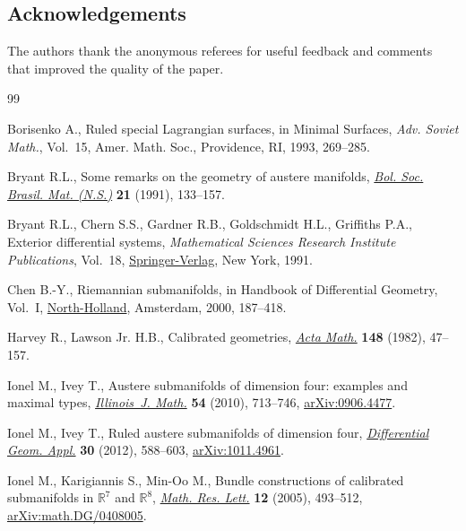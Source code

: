 \documentclass[10pt,a4paper]{amsart}
\numberwithin{equation}{section}
\begin{document}
\subsection*{Acknowledgements}
The authors thank the anonymous referees for useful feedback and comments that improved the quality of the paper.


\begin{thebibliography}{99}
\footnotesize\itemsep=0pt

Borisenko A., Ruled special {L}agrangian surfaces, in Minimal Surfaces,
 \textit{Adv. Soviet Math.}, Vol.~15, Amer. Math. Soc., Providence, RI, 1993,
 269--285.

Bryant R.L., Some remarks on the geometry of austere manifolds, \href{https://doi.org/10.1007/BF01237361}{\textit{Bol.
 Soc. Brasil. Mat. (N.S.)}} \textbf{21} (1991), 133--157.

Bryant R.L., Chern S.S., Gardner R.B., Goldschmidt H.L., Griffiths P.A.,
 Exterior differential systems, \textit{Mathematical Sciences Research
 Institute Publications}, Vol.~18, \href{https://doi.org/10.1007/978-1-4613-9714-4}{Springer-Verlag}, New York, 1991.

Chen B.-Y., Riemannian submanifolds, in Handbook of Differential Geometry,
 {V}ol.~{I}, \href{https://doi.org/10.1016/S1874-5741(00)80006-0}{North-Holland}, Amsterdam, 2000, 187--418.

Harvey R., Lawson Jr. H.B., Calibrated geometries, \href{https://doi.org/10.1007/BF02392726}{\textit{Acta Math.}}
 \textbf{148} (1982), 47--157.

Ionel M., Ivey T., Austere submanifolds of dimension four: examples and maximal
 types, \href{https://doi.org/10.1215/ijm/1318598678}{\textit{Illinois~J. Math.}} \textbf{54} (2010), 713--746,
 \href{https://arxiv.org/abs/0906.4477}{arXiv:0906.4477}.

Ionel M., Ivey T., Ruled austere submanifolds of dimension four,
 \href{https://doi.org/10.1016/j.difgeo.2012.07.007}{\textit{Differential Geom. Appl.}} \textbf{30} (2012), 588--603,
 \href{https://arxiv.org/abs/1011.4961}{arXiv:1011.4961}.

Ionel M., Karigiannis S., Min-Oo M., Bundle constructions of calibrated
 submanifolds in {${\mathbb R}^7$} and {${\mathbb R}^8$}, \href{https://doi.org/10.4310/MRL.2005.v12.n4.a5}{\textit{Math. Res.
 Lett.}} \textbf{12} (2005), 493--512, \href{https://arxiv.org/abs/math.DG/0408005}{arXiv:math.DG/0408005}.


\end{thebibliography}
\end{document}
